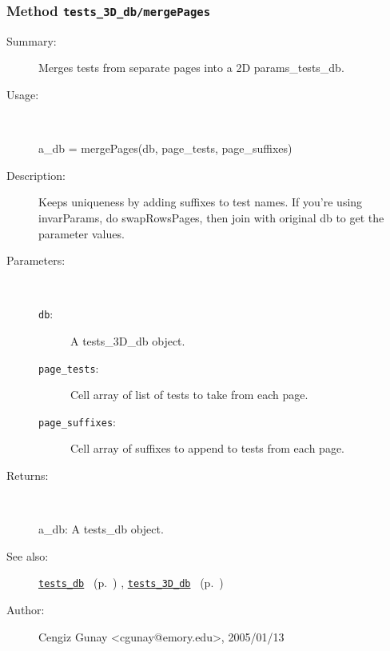 \subsubsection[Method \texttt{mergePages}]{Method \texttt{tests\_3D\_db/mergePages}}%
%
\label{ref_tests_3D_db__mergePages}%
\hypertarget{ref_tests_3D_db__mergePages}{}%
\begin{description}
\item[Summary:]Merges tests from separate pages into a 2D params\_tests\_db.
%
\item[Usage:]~%
\begin{lyxcode}%
a\_db = mergePages(db, page\_tests, page\_suffixes)
%
\end{lyxcode}%
%
\item[Description:]%
Keeps uniqueness by adding suffixes to test names.
 If you're using invarParams, do swapRowsPages, then join with original db to get
 the parameter values.
\item[Parameters:]~
\begin{description}%
\item[\texttt{db}:]
 A tests\_3D\_db object.
\item[\texttt{page\_tests}:]
 Cell array of list of tests to take from each page.
\item[\texttt{page\_suffixes}:]
 Cell array of suffixes to append to tests from each page.
\end{description}%
%
\item[Returns:]~

	a\_db: A tests\_db object.
%
%
\item[See also:]%
\hyperlink{ref_tests_db}{\texttt{tests\_db}}%
\ (p.~\pageref{ref_tests_db})%
%
, \hyperlink{ref_tests_3D_db}{\texttt{tests\_3D\_db}}%
\ (p.~\pageref{ref_tests_3D_db})%
%
%
\item[Author:]%
Cengiz Gunay <cgunay@emory.edu>, 2005/01/13%
\end{description}
\methodline%
